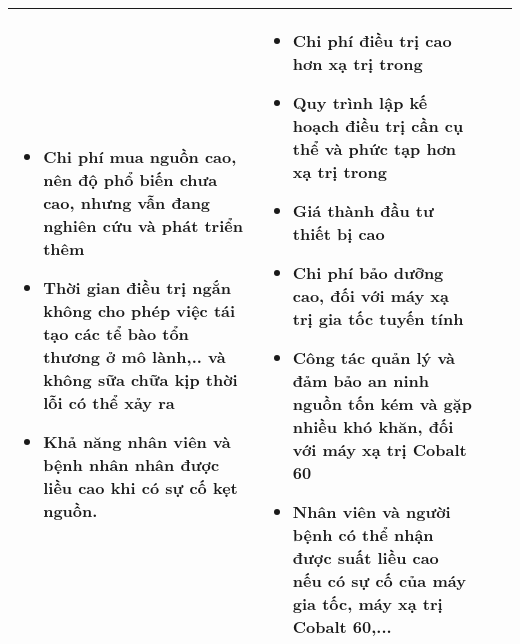 \begin{enumerate}
\begin{sidewaystable}[htbp]
\begin{tabular}{|p{0.6cm}|p{2.5cm}|p{11cm}|p{11cm}|}
\begin{minipage}[t]{11cm}
\begin{itemize}
                    \item Chi phí mua nguồn cao, nên độ phổ biến chưa cao, nhưng vẫn đang nghiên cứu và phát triển thêm
                    \item Thời gian điều trị ngắn không cho phép việc tái tạo các tể bào tổn thương ở mô lành,.. và không sữa chữa kịp thời lỗi có thể xảy ra
                    \item Khả năng nhân viên và bệnh nhân nhân được liều cao khi có sự cố kẹt nguồn.
                \end{itemize}                  
            \end{minipage}  & 
            \begin{minipage}[t]{11cm}
                \begin{itemize}
                    \item  Chi phí điều trị cao hơn xạ trị trong 
                    \item Quy trình lập kế hoạch điều trị cần cụ thể và phức tạp hơn xạ trị trong 
                    \item Giá thành đầu tư thiết bị cao
                    \item Chi phí bảo dưỡng cao, đối với máy xạ trị gia tốc tuyến tính 
                    \item Công tác quản lý và đảm bảo an ninh nguồn tốn kém và gặp nhiều khó khăn, đối với máy xạ trị Cobalt 60
                    \item Nhân viên và người bệnh có thể nhận được suất liều cao nếu có sự cố của máy gia tốc, máy xạ trị Cobalt 60,...
                \end{itemize}
                \vspace{0.4em}
            \end{minipage}\\    \hline
        \end{tabular} 
    \end{sidewaystable}
    \end{enumerate}
